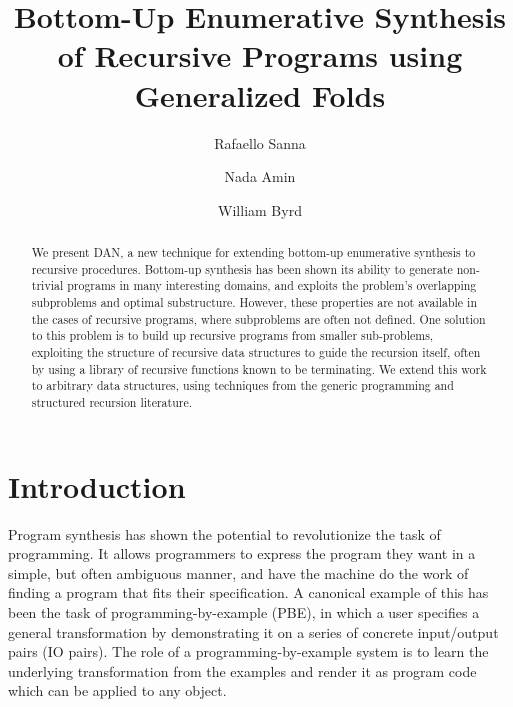 \documentclass[acmsmall,screen]{acmart}
\begin{document}
\title{Bottom-Up Enumerative Synthesis of Recursive Programs using Generalized Folds}

\author{Rafaello Sanna}
\author{Nada Amin}
\author{William Byrd}

\renewcommand{\shortauthors}{Raffi Sanna, Nada Amin and Will Byrd}

\renewcommand\footnotetextcopyrightpermission[1]{}
\pagestyle{fancy}
\fancyfoot{}
\makeatletter
\let\@authorsaddresses\@empty
\makeatother

\begin{abstract}
    We present DAN, a new technique for extending bottom-up enumerative synthesis to recursive procedures. Bottom-up synthesis has been shown its ability to generate non-trivial programs in many interesting domains, and exploits the problem's overlapping subproblems and optimal substructure. However, these properties are not available in the cases of recursive programs, where subproblems are often not defined. One solution to this problem is to build up recursive programs from smaller sub-problems, exploiting the structure of recursive data structures to guide the recursion itself, often by using a library of recursive functions known to be terminating. We extend this work to arbitrary data structures, using techniques from the generic programming and structured recursion literature.
\end{abstract}


\maketitle
\thispagestyle{firstfancy}

\section{Introduction}

Program synthesis has shown the potential to revolutionize the task of programming. It allows programmers to express the program they want in a simple, but often ambiguous manner, and have the machine do the work of finding a program that fits their specification. A canonical example of this has been the task of programming-by-example (PBE), in which a user specifies a general transformation by demonstrating it on a series of concrete input/output pairs (IO pairs). The role of a programming-by-example system is to learn the underlying transformation from the examples and render it as program code which can be applied to any object.
\end{document}
